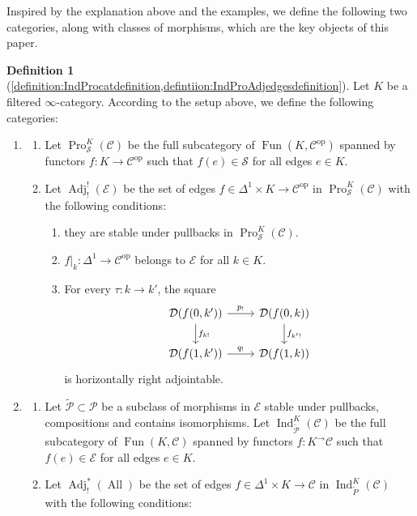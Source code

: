 \documentclass[14pt]{article}
\theoremstyle{definition}
\newtheorem{definition}[theorem]{Definition}
\newcommand{\E}{\mathcal{E}}
\newcommand{\D}{\mathcal{D}}
\renewcommand{\P}{\mathcal{P}}
\newcommand{\op}[1]{\operatorname{#1}}
\renewcommand{\S}{\mathcal{S}}
\newcommand{\Ca}{\mathcal{C}}
\numberwithin{subsection}{section}
\begin{document}
Inspired by the explanation above and the examples, we define the following two categories, along with classes of morphisms, which are the key objects of this paper. 
\begin{definition}[\cref{definition:IndProcatdefinition,defintiion:IndProAdjedgesdefinition}]
    Let $K$ be a filtered $\infty$-category. According to the setup above, we define the following categories:
    \begin{enumerate}
        \item 
        \begin{enumerate}
        \item Let $\op{Pro}^K_{\S}(\Ca)$ be the full subcategory of $\op{Fun}(K,\Ca^{\op{op}})$ spanned by functors $f: K \to \Ca^{\op{op}}$ such that $f(e)\in \S$ for all edges $e \in K$. 
        \item Let $\op{Adj}_!^!(\E)$ be the set of edges $f \in \Delta^1 \times K \to \Ca^{\op{op}}$ in $\op{Pro}^K_{\S}(\Ca)$   with the following conditions: 
    \begin{enumerate}
    \item they are stable under pullbacks in $\op{Pro}^K_{\S}(\Ca)$.
    \item $f|_k : \Delta^1 \to \Ca^{\op{op}}$ belongs to $\E$ for all $k \in K$.
    \item For every $\tau: k \to k'$, the square
    \begin{equation}
    \begin{tikzcd}
        \D(f(0,k')) \arrow[r," p_!"] \arrow[d,"f_{k!}"] & \D(f(0,k)) \arrow[d,"f_{k'!}"]\\
        \D(f(1,k')) \arrow[r,"q_!"] & \D(f(1,k))
        \end{tikzcd}
    \end{equation}
    is horizontally right adjointable.
    \end{enumerate}
    \end{enumerate}
         \item
         \begin{enumerate}
     \item Let $\tilde{\P} \subset \P$ be a subclass of morphisms in $\E$ stable under pullbacks, compositions and contains isomorphisms. Let $\op{Ind}^K_{\tilde{\P}}(\Ca)$ be the full subcategory of $\op{Fun}(K,\Ca)$ spanned by functors $f: K^ \to \Ca$ such that $f(e) \in \E$ for all edges $e \in K$. 
     \item Let $\op{Adj}_!^*(\op{All})$ be the set of edges $f \in \Delta^1 \times K \to \Ca$ in $\op{Ind}^K_{\tilde{P}}(\Ca)$  with the following conditions:


\end{enumerate}
\end{enumerate}
\end{definition}
\end{document}

